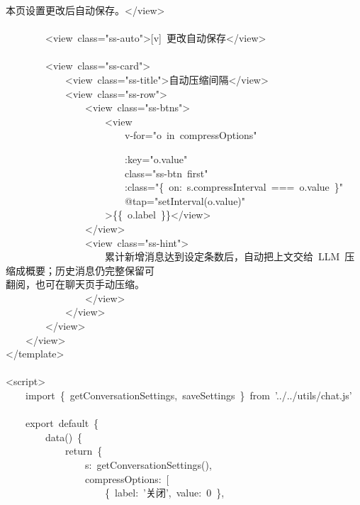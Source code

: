 \documentclass[a4paper,10pt]{article}
\begin{document}
{本页设置更改后自动保存。</view>\\
\mbox{}\\
~~~~~~~~<view~class="ss-auto">[v]~更改自动保存</view>\\
\mbox{}\\
~~~~~~~~<view~class="ss-card">\\
~~~~~~~~~~~~<view~class="ss-title">自动压缩间隔</view>\\
~~~~~~~~~~~~<view~class="ss-row">\\
~~~~~~~~~~~~~~~~<view~class="ss-btns">\\
~~~~~~~~~~~~~~~~~~~~<view\\
~~~~~~~~~~~~~~~~~~~~~~~~v-for="o~in~compressOptions"
}

\newpage

{\ttfamily\footnotesize\raggedright
~~~~~~~~~~~~~~~~~~~~~~~~:key="o.value"\\
~~~~~~~~~~~~~~~~~~~~~~~~class="ss-btn~first"\\
~~~~~~~~~~~~~~~~~~~~~~~~:class="\{~on:~s.compressInterval~===~o.value~\}"\\
~~~~~~~~~~~~~~~~~~~~~~~~@tap="setInterval(o.value)"\\
~~~~~~~~~~~~~~~~~~~~>\{\{~o.label~\}\}</view>\\
~~~~~~~~~~~~~~~~</view>\\
~~~~~~~~~~~~~~~~<view~class="ss-hint">\\
~~~~~~~~~~~~~~~~~~~~累计新增消息达到设定条数后，自动把上文交给~LLM~压缩成概要；历史消息仍完整保留可\\
翻阅，也可在聊天页手动压缩。\\
~~~~~~~~~~~~~~~~</view>\\
~~~~~~~~~~~~</view>\\
~~~~~~~~</view>\\
~~~~</view>\\
</template>\\
\mbox{}\\
<script>\\
~~~~import~\{~getConversationSettings,~saveSettings~\}~from~'../../utils/chat.js'\\
\mbox{}\\
~~~~export~default~\{\\
~~~~~~~~data()~\{\\
~~~~~~~~~~~~return~\{\\
~~~~~~~~~~~~~~~~s:~getConversationSettings(),\\
~~~~~~~~~~~~~~~~compressOptions:~[\\
~~~~~~~~~~~~~~~~~~~~\{~label:~'关闭',~value:~0~\},\\
}
\end{document}
